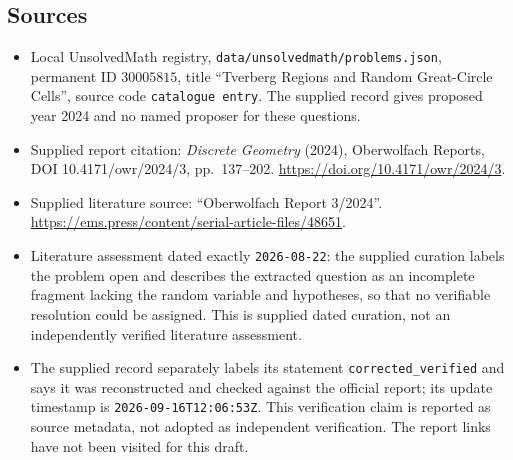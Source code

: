 \documentclass[11pt]{article}
\begin{document}
\subsection{Sources}
\begin{itemize}
\item Local UnsolvedMath registry, \texttt{data/unsolvedmath/problems.json}, permanent ID \(30005815\), title ``Tverberg Regions and Random Great-Circle Cells'', source code \texttt{catalogue entry}. The supplied record gives proposed year 2024 and no named proposer for these questions.
\item Supplied report citation: \emph{Discrete Geometry} (2024), Oberwolfach Reports, DOI 10.4171/owr/2024/3, pp.\ 137--202. \url{https://doi.org/10.4171/owr/2024/3}.
\item Supplied literature source: ``Oberwolfach Report 3/2024''. \url{https://ems.press/content/serial-article-files/48651}.
\item Literature assessment dated exactly \texttt{2026-08-22}: the supplied curation labels the problem open and describes the extracted question as an incomplete fragment lacking the random variable and hypotheses, so that no verifiable resolution could be assigned. This is supplied dated curation, not an independently verified literature assessment.
\item The supplied record separately labels its statement \texttt{corrected\_verified} and says it was reconstructed and checked against the official report; its update timestamp is \texttt{2026-09-16T12:06:53Z}. This verification claim is reported as source metadata, not adopted as independent verification. The report links have not been visited for this draft.
\end{itemize}
\end{document}

